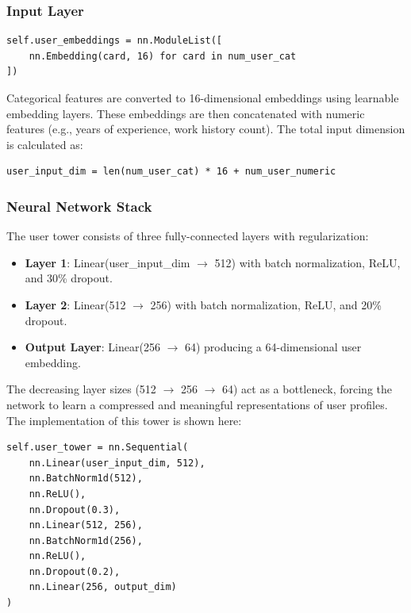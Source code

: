 \subsubsection{Input Layer}
\begin{listing}[H]
\begin{verbatim}
self.user_embeddings = nn.ModuleList([
    nn.Embedding(card, 16) for card in num_user_cat
])
\end{verbatim}
\caption{User embedding layer initialization in the two-tower model}
\label{lst:user_embeddings}
\end{listing}

Categorical features are converted to 16-dimensional embeddings using learnable embedding layers. These embeddings are then concatenated with numeric features (e.g., years of experience, work history count). The total input dimension is calculated as:

\begin{listing}[H]
\begin{verbatim}
user_input_dim = len(num_user_cat) * 16 + num_user_numeric
\end{verbatim}
\caption{User input dimension calculation}
\label{lst:user_input_dim}
\end{listing}

\subsubsection{Neural Network Stack}

The user tower consists of three fully-connected layers with regularization:
\begin{itemize}
    \item \textbf{Layer 1}: Linear(user\_input\_dim $\rightarrow$ 512) with batch normalization, ReLU, and 30\% dropout.
    \item \textbf{Layer 2}: Linear(512 $\rightarrow$ 256) with batch normalization, ReLU, and 20\% dropout.
    \item \textbf{Output Layer}: Linear(256 $\rightarrow$ 64) producing a 64-dimensional user embedding.
\end{itemize}

The decreasing layer sizes (512 $\rightarrow$ 256 $\rightarrow$ 64) act as a bottleneck, forcing the network to learn a compressed and meaningful representations of user profiles. The implementation of this tower is shown here:

\begin{listing}[H]
\begin{verbatim}
self.user_tower = nn.Sequential(
    nn.Linear(user_input_dim, 512),
    nn.BatchNorm1d(512),
    nn.ReLU(),
    nn.Dropout(0.3),
    nn.Linear(512, 256),
    nn.BatchNorm1d(256),
    nn.ReLU(),
    nn.Dropout(0.2),
    nn.Linear(256, output_dim)
)
\end{verbatim}
\caption{User tower architecture in the two-tower model}
\label{lst:user_tower}
\end{listing}

